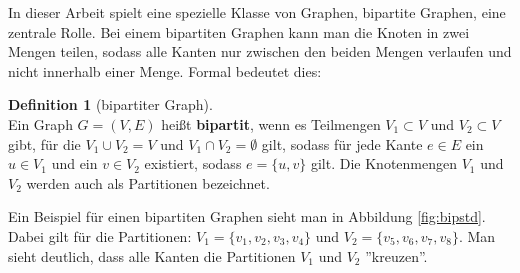 \documentclass[a4paper]{scrreprt}
\theoremstyle{plain} %
\theoremstyle{definition} %
\newtheorem{definition}[theorem]{Definition}
\begin{document}


                                
   

\noindent
In dieser Arbeit spielt eine spezielle Klasse von Graphen, bipartite Graphen, eine zentrale Rolle.
Bei einem bipartiten Graphen kann man die Knoten in zwei Mengen teilen, sodass alle Kanten nur zwischen den 
beiden Mengen verlaufen und nicht innerhalb einer Menge. Formal bedeutet dies:
\begin{definition}[bipartiter Graph] ~\\
Ein Graph $G=(V,E)$ heißt \textbf{bipartit}, wenn es Teilmengen $V_1 \subset V$ und $V_2 \subset V$ gibt, für die 
$V_1 \cup V_2 = V$ und $V_1 \cap V_2 = \emptyset$ gilt,
 sodass für jede Kante $e \in E$ ein $u \in V_1$ und ein $v \in V_2$ existiert, sodass $e = \{u,v\}$ gilt.
Die Knotenmengen $V_1$ und $V_2$ werden auch als Partitionen bezeichnet.
\end{definition}

\noindent
Ein Beispiel für einen bipartiten Graphen sieht man in Abbildung \ref{fig:bipstd}. Dabei gilt für die Partitionen:
$V_1 = \{v_1,v_2,v_3,v_4\}$ und $V_2 = \{v_5,v_6,v_7,v_8\}$. Man sieht deutlich, dass alle Kanten die Partitionen
$V_1$ und $V_2$ ''kreuzen''.
\end{document}
